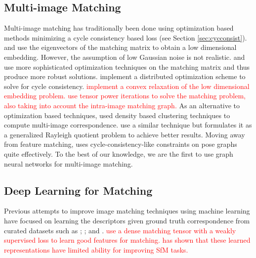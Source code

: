 \documentclass{article} %
\begin{document}
\subsection{Multi-image Matching}
Multi-image matching has traditionally been done using optimization based methods minimizing a cycle consistency based loss (see Section \ref{sec:cycconsist}).
\cite{pachauri2013solving} and \cite{arrigoni2017synchronization} use the eigenvectors of the matching matrix to obtain a low dimensional embedding. 
However, the assumption of low Gaussian noise is not realistic.
\cite{zhou2015multi} and \cite{wang2017multi} use more sophisticated optimization techniques on the matching matrix and thus produce more robust solutions.
\cite{leonardos2017distributed} implement a distributed optimization scheme to solve for cycle consistency.
\textcolor{red}{\cite{swoboda2019convex} implement a convex relaxation of the low dimensional embedding problem.}
\textcolor{red}{\cite{shi2016tensor} use tensor power iterations to solve the matching problem, also taking into account the intra-image matching graph.}
As an alternative to optimization based techniques, \cite{tron2017fast} used density based clustering techniques to compute multi-image correspondence.
\cite{fathian2019clear} use a similar technique but formulates it as a generalized Rayleigh quotient problem to achieve better results.
Moving away from feature matching, \cite{zach2010disambiguating} uses cycle-consistency-like constraints on pose graphs quite effectively.
To the best of our knowledge, we are the first to use graph neural networks for multi-image matching.

\subsection{Deep Learning for Matching}
Previous attempts to improve image matching techniques using machine learning have focused on learning the descriptors given ground truth correspondence from curated datasets such as \cite{zagoruyko2015learning}; \cite{yi2016lift}; and \cite{brachmann2017dsac}.
\textcolor{red}{\cite{rocco2018neighbourhood} use a dense matching tensor with a weakly supervised loss to learn good features for matching. \cite{zhou2019learn} has shown that these learned representations have limited ability for improving SfM tasks.}
\end{document}
